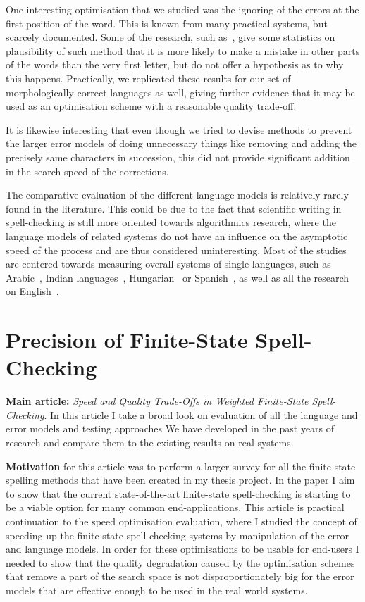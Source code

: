 \documentclass[officiallayout]{unihelcompling}
\begin{document}
One interesting optimisation that we studied was the ignoring of the errors at
the first-position of the word. This is known from many practical systems, but
scarcely documented. Some of the research, such as~\citet{bhagat2007spelling},
give some statistics on plausibility of such method that it is more likely to
make a mistake in other parts of the words than the very first letter, but do
not offer a hypothesis as to why this happens.  Practically, we replicated
these results for our set of morphologically correct languages as well, giving
further evidence that it may be used as an optimisation scheme with a
reasonable quality trade-off.

It is likewise interesting that even though we tried to devise methods to
prevent the larger error models of doing unnecessary things like removing and
adding the precisely same characters in succession, this did not provide
significant addition in the search speed of the corrections.

The comparative evaluation of the different language models is relatively
rarely found in the literature. This could be due to the fact that scientific
writing in spell-checking is still more oriented towards algorithmics research,
where the language models of related systems do not have an influence on the
asymptotic speed of the process and are thus considered uninteresting.  Most of
the studies are centered towards measuring overall systems of single languages,
such as Arabic~\citep{attia2013improved}, Indian
languages~\citep{chaudhuri2002towards}, Hungarian~\citep{tron2005hunmorph} or
Spanish~\cite{otero2007contextual}, as well as all the research on
English~\citep{mitton1987spelling}.

\section{Precision of Finite-State Spell-Checking}
\label{sec:quality}

\textbf{Main article:} \emph{Speed and Quality Trade-Offs in Weighted
Finite-State Spell-Checking}. In this article I take a broad look on evaluation
of all the language and error models and testing approaches We have developed
in the past years of research and compare them to the existing results on real
systems.

\textbf{Motivation} for this article was to perform a larger survey for all the
finite-state spelling methods that have been created in my thesis project. In
the paper I aim to show that the current state-of-the-art finite-state
spell-checking is starting to be a viable option for many common
end-applications. This article is practical continuation to the speed
optimisation evaluation, where I studied the concept of speeding up the
finite-state spell-checking systems by manipulation of the error and language
models. In order for these optimisations to be usable for end-users I needed to
show that the quality degradation caused by the optimisation schemes that
remove a part of the search space is not disproportionately big for the error
models that are effective enough to be used in the real world systems.
\end{document}

